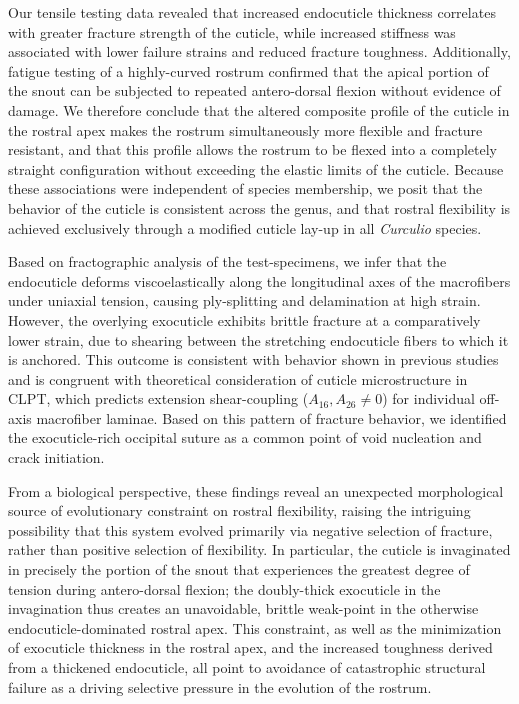 \documentclass[twocolumn, linenumbers, superscriptaddress, nofootinbib]{revtex4-1}
\begin{document}
		Our tensile testing data revealed that increased endocuticle thickness correlates with greater fracture strength of the cuticle, while increased stiffness was associated with lower failure strains and reduced fracture toughness.
		Additionally, fatigue testing of a highly-curved rostrum confirmed that the apical portion of the snout can be subjected to repeated antero-dorsal flexion without evidence of damage.
		We therefore conclude that the altered composite profile of the cuticle in the rostral apex makes the rostrum simultaneously more flexible and fracture resistant, and that this profile allows the rostrum to be flexed into a completely straight configuration without exceeding the elastic limits of the cuticle.
		Because these associations were independent of species membership, we posit that the behavior of the cuticle is consistent across the genus, and that rostral flexibility is achieved exclusively through a modified cuticle lay-up in all \textit{Curculio} species.
		
		Based on fractographic analysis of the test-specimens, we infer that the endocuticle deforms viscoelastically along the longitudinal axes of the macrofibers under uniaxial tension, causing ply-splitting and delamination at high strain.
		However, the overlying exocuticle exhibits brittle fracture at a comparatively lower strain, due to shearing between the stretching endocuticle fibers to which it is anchored.
		This outcome is consistent with behavior shown in previous studies and is congruent with theoretical consideration of cuticle microstructure in CLPT, which predicts extension shear-coupling ($A_{16}, A_{26}\neq{0}$) for individual off-axis macrofiber laminae.
		Based on this pattern of fracture behavior, we identified the exocuticle-rich occipital suture as a common point of void nucleation and crack initiation.
		
		From a biological perspective, these findings reveal an unexpected morphological source of evolutionary constraint on rostral flexibility, raising the intriguing possibility that this system evolved primarily via negative selection of fracture, rather than positive selection of flexibility.
		In particular, the cuticle is invaginated in precisely the portion of the snout that experiences the greatest degree of tension during antero-dorsal flexion; the doubly-thick exocuticle in the invagination thus creates an unavoidable, brittle weak-point in the otherwise endocuticle-dominated rostral apex.
		This constraint, as well as the minimization of exocuticle thickness in the rostral apex, and the increased toughness derived from a thickened endocuticle, all point to avoidance of catastrophic structural failure as a driving selective pressure in the evolution of the rostrum.
		
\end{document}
